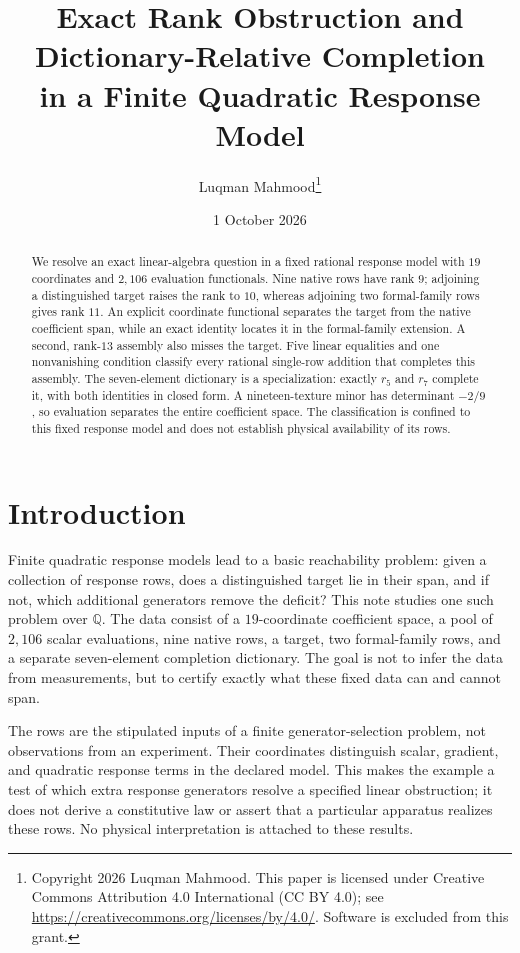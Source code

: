 \documentclass[12pt]{article}
\title{Exact Rank Obstruction and Dictionary-Relative Completion\\
in a Finite Quadratic Response Model}
\author{Luqman Mahmood\thanks{Copyright 2026 Luqman Mahmood. This paper is licensed under Creative Commons Attribution 4.0 International (CC BY 4.0); see \url{https://creativecommons.org/licenses/by/4.0/}. Software is excluded from this grant.}}
\date{1 October 2026}
\theoremstyle{definition}
\theoremstyle{remark}
\newcommand{\QQ}{\mathbb Q}
\begin{document}
\maketitle

\begin{abstract}
We resolve an exact linear-algebra question in a fixed rational response
model with $19$ coordinates and $2{,}106$ evaluation functionals.  Nine native
rows have rank $9$; adjoining a distinguished target raises the rank to $10$,
whereas adjoining two formal-family rows gives rank $11$.  An explicit
coordinate functional separates the target from the native coefficient span,
while an exact identity locates it in the formal-family extension.  A second,
rank-$13$ assembly also misses the target.  Five linear equalities and one
nonvanishing condition classify every rational single-row addition that
completes this assembly.  The seven-element dictionary is a specialization:
exactly $r_5$ and $r_7$ complete it, with both identities in closed form.
A nineteen-texture minor has determinant $-2/9$, so evaluation separates the
entire coefficient space.  The classification is confined to this fixed
response model and does not establish physical availability of its rows.
\end{abstract}

\section{Introduction}\label{sec:perimeter}

Finite quadratic response models lead to a basic reachability problem: given
a collection of response rows, does a distinguished target lie in their span,
and if not, which additional generators remove the deficit?  This note studies
one such problem over $\QQ$.  The data consist of a $19$-coordinate coefficient
space, a pool of $2{,}106$ scalar evaluations, nine native rows, a target, two
formal-family rows, and a separate seven-element completion dictionary.  The
goal is not to infer the data from measurements, but to certify exactly what
these fixed data can and cannot span.

The rows are the stipulated inputs of a finite generator-selection problem,
not observations from an experiment.  Their coordinates distinguish scalar,
gradient, and quadratic response terms in the declared model.  This makes
the example a test of which extra response generators resolve a specified
linear obstruction; it does not derive a constitutive law or assert that a
particular apparatus realizes these rows.  No physical interpretation is
attached to these results.
\end{document}
